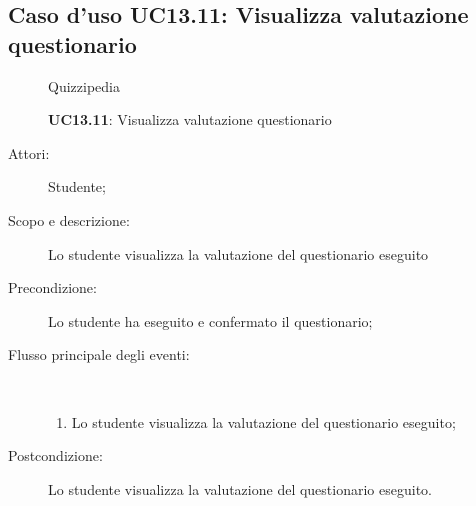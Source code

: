 \subsection{Caso d'uso UC13.11: Visualizza valutazione questionario}
	\begin{figure}[H]
		\centering
		\begin{resizedtikzpicture}{\textwidth}
		\begin{umlsystem}[x=0, fill=lightgray!20]{Quizzipedia}
		\end{umlsystem}
		\end{resizedtikzpicture}
		\caption{\textbf{UC13.11}: Visualizza valutazione questionario}
		\label{UC13.11}
	\end{figure}
\begin{description}
\item[Attori:] Studente;
\item[Scopo e descrizione:] Lo studente visualizza la valutazione del questionario eseguito
      \item[Precondizione:] Lo studente ha eseguito e confermato il questionario;

        \item[Flusso principale degli eventi:] \ 
 \begin{enumerate}
          \item Lo studente visualizza la valutazione del questionario eseguito;

      \end{enumerate}
    \item[Postcondizione:] Lo studente visualizza la valutazione del questionario eseguito.
  \end{description}
\hypertarget{UC14}{}
